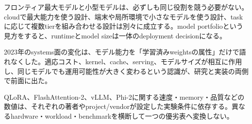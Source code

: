 フロンティア最大モデルと小型モデルは、必ずしも同じ役割を競う必要がない。cloudで最大能力を使う設計、端末や局所環境で小さなモデルを使う設計、taskに応じて複数tierを組み合わせる設計は別々に成立する。model portfolioという見方をすると、runtimeとmodel sizeは一体のdeployment decisionになる。\autocite{src-6e61359d2fae}


2023年のsystems面の変化は、モデル能力を「学習済みweightsの属性」だけで語れなくした。適応コスト、kernel、cache、serving、モデルサイズが相互に作用し、同じモデルでも運用可能性が大きく変わるという認識が、研究と実装の両側で前面に出た。\autocite{src-1ab9d44a819a,src-5e1a3a4fc45b,src-6e61359d2fae,src-7f830e688335,src-e03b0ba5b24e,src-fb804ac849e4}


\begin{claimboundary}
QLoRA、FlashAttention-2、vLLM、Phi-2に関する速度・memory・品質などの数値は、それぞれの著者やproject/vendorが設定した実験条件に依存する。異なるhardware・workload・benchmarkを横断して一つの優劣表へ変換しない。\autocite{src-1ab9d44a819a,src-5e1a3a4fc45b,src-6e61359d2fae,src-7f830e688335,src-e03b0ba5b24e,src-fb804ac849e4}
\end{claimboundary}

